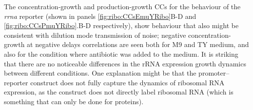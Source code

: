 The concentration-growth and production-growth CCs for
the behaviour of the \textit{rrna} reporter 
(shown in panels \ref{fig:ribo:CCsEmuYRibo}B-D and \ref{fig:ribo:CCsPmuYRibo}.B-D respectively), %
show behaviour that also might be consistent with dilution mode transmission of noise; negative concentration-growth at negative delays correlations are seen both for M9 and TY medium, and also for the condition where antibiotic was added to the medium.
%
It is striking that there are no noticeable differences in the rRNA expression growth dynamics between different conditions.
%
One explanation might be that 
the promoter--reporter construct does not fully capture the dynamics of ribosomal RNA expression, as the construct does not directly label ribosomal RNA (which is something that can only be done for proteins).



